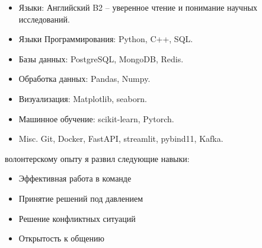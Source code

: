 







\smallskip
\begin{itemize}
    \item Языки: Английский B2 -- уверенное чтение и понимание научных исследований.
    \smallskip
    \item Языки Программирования: Python, C++, SQL.
    \smallskip
    \item Базы данных: PostgreSQL, MongoDB, Redis.
    \smallskip
    \item Обработка данных: Pandas, Numpy.
    \smallskip
    \item Визуализация: Matplotlib, seaborn.
    \smallskip
    \item Машинное обучение: scikit-learn, Pytorch.
    \smallskip
    \item Misc. Git, Docker, FastAPI, streamlit, pybind11, Kafka.
\end{itemize}

 волонтерскому опыту я развил следующие навыки:
\smallskip
\smallskip
\begin{itemize}\large
    \item Эффективная работа в команде
    \smallskip
    \item Принятие решений под давлением
    \smallskip
    \item Решение конфликтных ситуаций\smallskip
    \item Открытость к общению 
\end{itemize}
\smallskip
\smallskip


\cvproject{}